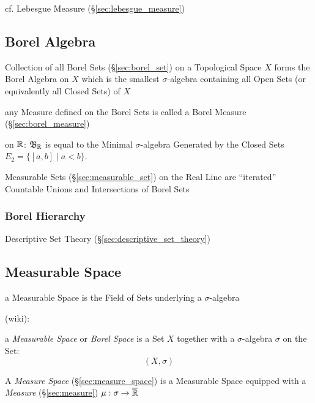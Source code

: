 cf. Lebesgue Measure (\S\ref{sec:lebesgue_measure})



\subsection{Borel Algebra}\label{sec:borel_algebra}

Collection of all Borel Sets (\S\ref{sec:borel_set}) on a Topological Space $X$
forms the Borel Algebra on $X$ which is the smallest $\sigma$-algebra
containing all Open Sets (or equivalently all Closed Sets) of $X$

any Measure defined on the Borel Sets is called a Borel Measure
(\S\ref{sec:borel_measure})

on $\mathbb{R}$: $\mathfrak{B}_{\mathbb{R}}$ is equal to the Minimal $\sigma$-algebra
Generated by the Closed Sets $E_2 = \{ [a,b] \;|\; a < b \}$.

Measurable Sets (\S\ref{sec:measurable_set}) on the Real Line are ``iterated''
Countable Unions and Intersections of Borel Sets



\subsubsection{Borel Hierarchy}\label{sec:borel_hierarchy}\hfill

\fist Descriptive Set Theory (\S\ref{sec:descriptive_set_theory})



\subsection{Measurable Space}\label{sec:measurable_space}

a Measurable Space is the Field of Sets underlying a $\sigma$-algebra

(wiki):

a \emph{Measurable Space} or \emph{Borel Space} is a Set $X$ together with a
$\sigma$-algebra $\sigma$ on the Set:
\[
  (X,\sigma)
\]

\fist A \emph{Measure Space} (\S\ref{sec:measure_space}) is a Measurable Space
equipped with a \emph{Measure} (\S\ref{sec:measure})
$\mu : \sigma \rightarrow \overline{\mathbb{R}}$

